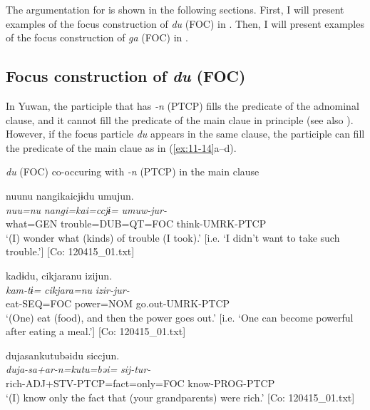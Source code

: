 The argumentation for  is shown in the following sections. First, I will present examples of the focus construction of \textit{du} (FOC) in . Then, I will present examples of the focus construction of \textit{ga} (FOC) in .

\subsection{Focus construction of \textit{du} (FOC)}\label{sec:11.3.1}

In Yuwan, the participle that has \textit{{}-n} (PTCP) fills the predicate of the adnominal clause, and it cannot fill the predicate of the main claue in principle (see also ). However, if the focus particle \textit{du} appears in the same clause, the participle can fill the predicate of the main claue as in (\ref{ex:11-14}a--d).

\ea\label{ex:11-15}  \textit{du} (FOC) co-occuring with \textit{{}-n} (PTCP) in the main clause

  \ea\relax[= (6-108 a)]

    
      \glll    nuunu  nangikaicjɨdu  umujun.\\
      \textit{nuu=nu}  \textit{nangi=kai=ccjɨ=}  \textit{umuw-jur-}\\
      what=GEN  trouble=DUB=QT=FOC  think-UMRK-PTCP\\
\glt       ‘(I) wonder what (kinds) of trouble (I took).’ [i.e. ‘I didn’t want to take such trouble.’] [Co: 120415\_01.txt]

  \ex  
      \glll    kadɨdu,  cikjaranu  izijun.\\
      \textit{kam-tɨ=}  \textit{cikjara=nu}  \textit{izir-jur-}\\
      eat-SEQ=FOC  power=NOM  go.out-UMRK-PTCP\\
\glt       ‘(One) eat (food), and then the power goes out.’ [i.e. ‘One can become powerful after eating a meal.’] [Co: 120415\_01.txt]

  \ex  
      \glll    dujasankutubəidu  siccjun.\\
      \textit{duja-sa+ar-n=kutu=bəi=}  \textit{sij-tur-}\\
      rich-ADJ+STV-PTCP=fact=only=FOC  know-PROG-PTCP\\
    \glt       ‘(I) know only the fact that (your grandparents) were rich.’ [Co: 120415\_01.txt]

